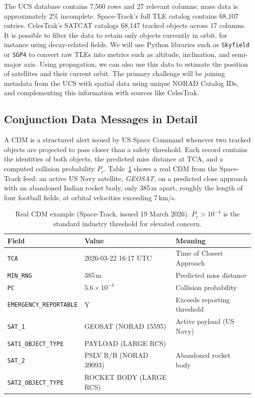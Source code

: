 The UCS database contains 7,560 rows and 27 relevant columns; mass data is approximately 2\% incomplete. Space-Track’s full TLE catalog contains 68,107 entries. CelesTrak’s SATCAT catalogs 68,147 tracked objects across 17 columns. It is possible to filter the data to retain only objects currently in orbit, for instance using decay-related fields. We will use Python libraries such as \texttt{Skyfield} or \texttt{SGP4} to convert raw TLEs into metrics such as altitude, inclination, and semi-major axis. Using propagation, we can also use this data to estimate the position of satellites and their current orbit. The primary challenge will be joining metadata from the UCS with spatial data using unique NORAD Catalog IDs, and complementing this information with sources like CelesTrak.

\subsection{Conjunction Data Messages in Detail}
A CDM is a structured alert issued by US Space Command whenever two tracked objects are projected to pass closer than a safety threshold. Each record contains the identities of both objects, the predicted miss distance at TCA, and a computed collision probability $P_c$. Table~\ref{tab:cdm-example} shows a real CDM from the Space-Track feed: an active US Navy satellite, \textit{GEOSAT}, on a predicted close approach with an abandoned Indian rocket body, only 385\,m apart, roughly the length of four football fields, at orbital velocities exceeding 7\,km/s.

\begin{table}[H]
    \centering
    \caption{Real CDM example (Space-Track, issued 19 March 2026). $P_c > 10^{-4}$ is the standard industry threshold for elevated concern.}
    \label{tab:cdm-example}
    \begin{tabular}{@{}lll@{}} \toprule
        Field & Value & Meaning \\ \midrule
        \texttt{TCA}        & 2026-03-22 16:17 UTC  & Time of Closest Approach \\
        \texttt{MIN\_RNG}   & 385\,m                & Predicted miss distance \\
        \texttt{PC}         & $5.6 \times 10^{-4}$  & Collision probability \\
        \texttt{EMERGENCY\_REPORTABLE} & Y & Exceeds reporting threshold \\
        \texttt{SAT\_1}     & GEOSAT (NORAD 15595)  & Active payload (US Navy) \\
        \texttt{SAT1\_OBJECT\_TYPE} & PAYLOAD (LARGE RCS)  & \\
        \texttt{SAT\_2}     & PSLV R/B (NORAD 39093) & Abandoned rocket body \\
        \texttt{SAT2\_OBJECT\_TYPE} & ROCKET BODY (LARGE RCS) & \\ \bottomrule
    \end{tabular}
\end{table}


